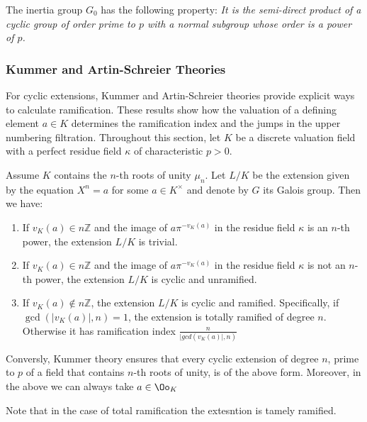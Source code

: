\begin{prop}
    The inertia group $G_0$ has the following property:
    \textit{It is the semi-direct product of a cyclic group of order prime to $p$ with a normal subgroup whose order is a power of $p$.}
\end{prop}





\subsubsection*{Kummer and Artin-Schreier Theories}
For cyclic extensions, Kummer and Artin-Schreier theories provide explicit ways to calculate ramification. 
These results show how the valuation of a defining element $a \in K$ determines the ramification index and the jumps in the upper numbering filtration.
Throughout this section, let $K$ be a discrete valuation field with a perfect residue field $\kappa$ of characteristic $p > 0$.

\begin{theorem}\label{theorem:kummer_ramification}
Assume $K$ contains the $n$-th roots of unity $\mu_n$. 
Let $L/K$ be the extension given by the equation $X^n = a$ for some 
$a \in K^\times$ and denote by $G$ its Galois group. Then we have:

\begin{enumerate}
    \item If $v_K(a) \in n\mathbb{Z}$ and the image of $a\pi^{-v_K(a)}$ in the residue field $\kappa$ is an $n$-th power, the extension $L/K$ is trivial.
    \item If $v_K(a) \in n\mathbb{Z}$ and the image of $a\pi^{-v_K(a)}$ in the residue field $\kappa$ is not an $n$-th power, the extension $L/K$ is cyclic and unramified.
    \item If $v_K(a) \notin n\mathbb{Z}$, the extension $L/K$ is cyclic and ramified. Specifically, if $\gcd(|v_K(a)|, n) = 1$, the extension is totally ramified of degree $n$.
     Otherwise it has ramification index $\frac{n}{|gcd(v_K(a)|, n)}$
\end{enumerate}
Conversly, Kummer theory ensures that every cyclic extension of degree $n$, prime to $p$ of a field that contains $n$-th roots of unity, is of the above form.
Moreover, in the above we can always take $a \in \Oo_K$
\end{theorem}
Note that in the case of total ramification the extesntion is tamely ramified.


